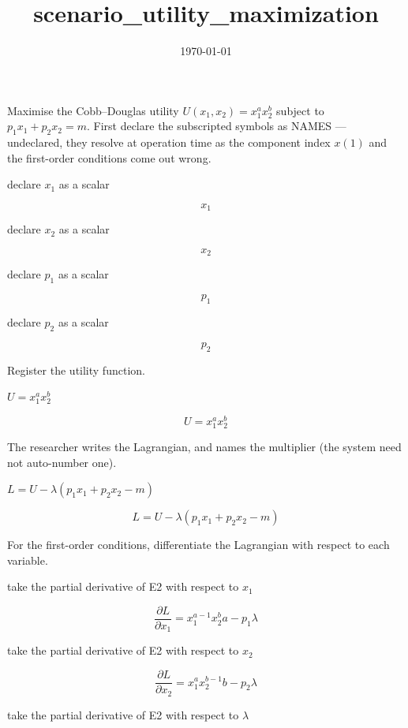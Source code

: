 \documentclass[dvipdfmx]{article}
\title{scenario\_utility\_maximization}
\date{\today}
\begin{document}
\maketitle

Maximise the Cobb–Douglas utility $U(x_1,x_2)=x_1^ax_2^b$ subject to $p_1x_1+p_2x_2=m$. First declare the subscripted symbols as NAMES — undeclared, they resolve at operation time as the component index $x(1)$ and the first-order conditions come out wrong.

declare $x_1$ as a scalar

\[
  x_1
\]

declare $x_2$ as a scalar

\[
  x_2
\]

declare $p_1$ as a scalar

\[
  p_1
\]

declare $p_2$ as a scalar

\[
  p_2
\]

Register the utility function.

$U = x_1^a x_2^b$

\begin{equation}
  U = x_1^a x_2^b
  \label{eq:E1}
\end{equation}

The researcher writes the Lagrangian, and names the multiplier (the system need not auto-number one).

$L = U - \lambda (p_1 x_1 + p_2 x_2 - m)$

\begin{equation}
  L = U - \lambda (p_1 x_1 + p_2 x_2 - m)
  \label{eq:E2}
\end{equation}

For the first-order conditions, differentiate the Lagrangian with respect to each variable.

take the partial derivative of E2 with respect to $x_1$

\begin{equation}
  \frac{\partial L}{\partial x_1} = x_{1}^{a-1} x_{2}^{b} a-p_{1} \lambda
  \label{eq:E3}
\end{equation}

take the partial derivative of E2 with respect to $x_2$

\begin{equation}
  \frac{\partial L}{\partial x_2} = x_{1}^{a} x_{2}^{b-1} b-p_{2} \lambda
  \label{eq:E4}
\end{equation}

take the partial derivative of E2 with respect to $\lambda$
\end{document}

